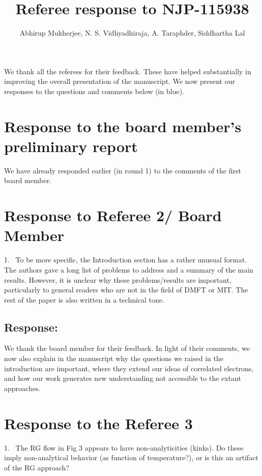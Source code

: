 \documentclass{article}
\title{\vspace*{-40pt}Referee response to NJP-115938}
\author{Abhirup Mukherjee, N. S. Vidhyadhiraja, A. Taraphder, Siddhartha Lal}
\newcommand{\response}[1]{{\color{blue}\subsection*{Response:}{#1}\vspace*{10pt}}}
\begin{document}
\maketitle

\flushleft
We thank all the referees for their feedback. These have helped substantially in improving the overall presentation of the manuscript. We now present our responses to the questions and comments below (in blue).

\section*{Response to the board member's preliminary report}
{\color{blue}
	We have already responded earlier (in round 1) to the comments of the first board member. 
}

\section*{Response to Referee 2/ Board Member}
1.~
To be more specific, the Introduction section has a rather unusual format. The authors gave a long list of problems to address and a summary of the main results. However, it is unclear why these problems/results are important, particularly to general readers who are not in the field of DMFT or MIT. The rest of the paper is also written in a technical tone.

\response{
	We thank the board member for their feedback. In light of their comments, we now also explain in the manuscript why the questions we raised in the introduction are important, where they extend our ideas of correlated electrons, and how our work generates new understanding not accessible to the extant approaches.}

\section*{Response to the Referee 3}
1.~
The RG flow in Fig 3 appears to have non-analyticities (kinks). Do these imply non-analytical behavior (as function of temperature?), or is this an artifact of the RG approach?
\end{document}
